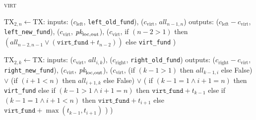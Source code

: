 \begin{processbox}{\textsc{virt}}
\begin{algorithmic}[1]
        \State $\mathrm{TX}_{2, n} \gets \mathrm{TX}$:
        \Indent
          \State inputs:
          \Indent
            \State ($c_{\mathrm{left}}$, \texttt{left\_old\_fund}),
            \State ($c_{\mathrm{virt}}$, $\mathit{all}_{n-1, n}$)
          \EndIndent
          \State outputs:
          \Indent
            \State ($c_{\mathrm{left}} - c_{\mathrm{virt}}$,
            \texttt{left\_new\_fund}),
            \State ($c_{\mathrm{virt}}$, $\textit{pk}_{\mathrm{loc}, \mathrm{out}}$),
            \State ($c_{\mathrm{virt}}$,
            \Indent
              \State if $(n-2 > 1)$ then $(\mathit{all}_{n-2, n-1} \vee
              (\texttt{virt\_fund} + t_{n-2}))$
              \State else \texttt{virt\_fund}
            \EndIndent
            \State )
          \EndIndent
        \EndIndent
      \EndIf

       
        \State $\mathrm{TX}_{2, k} \gets \mathrm{TX}$:
        \Indent
          \State inputs:
          \Indent
            \State ($c_{\mathrm{virt}}$, $\mathit{all}_{i, k}$),
            \State ($c_{\mathrm{right}}$, \texttt{right\_old\_fund})
          \EndIndent
          \State outputs:
          \Indent
            \State ($c_{\mathrm{right}} - c_{\mathrm{virt}}$,
            \texttt{right\_new\_fund}),
            \State ($c_{\mathrm{virt}}$, $\textit{pk}_{\mathrm{loc}, \mathrm{out}}$),
            \State ($c_{\mathrm{virt}}$,
            \Indent
              \State (if $(k-1 > 1)$ then $\mathit{all}_{k-1, i}$ else False)
              \State $\vee$ (if $(i+1 < n)$ then $\mathit{all}_{i+1, k}$ else
              False)
              \State $\vee$ (
              \Indent
                \State if $(k-1 = 1 \wedge i+1 = n)$ then \texttt{virt\_fund}
                \State else if $(k-1 > 1 \wedge i+1 = n)$ then
                $\texttt{virt\_fund} + t_{k-1}$
                \State else if $(k-1 = 1 \wedge i+1 < n)$ then
                $\texttt{virt\_fund} + t_{i+1}$
                \State else 
                $\texttt{virt\_fund} + \max{(t_{k-1}, t_{i+1})}$
              \EndIndent
              \State )
            \EndIndent
            \State )
          \EndIndent
        \EndIndent
      \EndFor


\end{algorithmic}
\end{processbox}
